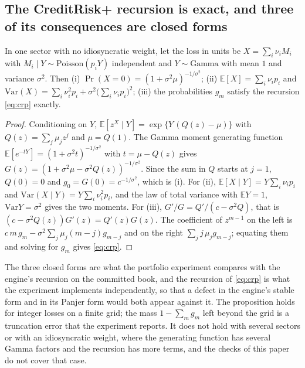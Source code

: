 \subsection{The CreditRisk+ recursion is exact, and three of its consequences are closed forms}

\begin{proposition}\label{prop:crp}
In one sector with no idiosyncratic weight, let the loss in units be $X=\sum_i\nu_iM_i$ with $M_i\mid Y\sim\mathrm{Poisson}(p_iY)$ independent and $Y\sim\mathrm{Gamma}$ with mean $1$ and variance $\sigma^2$. Then (i) $\Pr(X=0)=(1+\sigma^2\mu)^{-1/\sigma^2}$; (ii) $\mathbb{E}[X]=\sum_i\nu_ip_i$ and $\mathrm{Var}(X)=\sum_i\nu_i^2p_i+\sigma^2\bigl(\sum_i\nu_ip_i\bigr)^2$; (iii) the probabilities $g_m$ satisfy the recursion \eqref{eq:crp} exactly.
\end{proposition}

\begin{proof}
Conditioning on $Y$, $\mathbb{E}[z^X\mid Y]=\exp\{Y\,(Q(z)-\mu)\}$ with $Q(z)=\sum_j\mu_jz^j$ and $\mu=Q(1)$. The Gamma moment generating function $\mathbb{E}[e^{-tY}]=(1+\sigma^2t)^{-1/\sigma^2}$ with $t=\mu-Q(z)$ gives $G(z)=(1+\sigma^2\mu-\sigma^2Q(z))^{-1/\sigma^2}$. Since the sum in $Q$ starts at $j=1$, $Q(0)=0$ and $g_0=G(0)=c^{-1/\sigma^2}$, which is (i). For (ii), $\mathbb{E}[X\mid Y]=Y\sum_i\nu_ip_i$ and $\mathrm{Var}(X\mid Y)=Y\sum_i\nu_i^2p_i$, and the law of total variance with $\mathbb{E}Y=1$, $\mathrm{Var}Y=\sigma^2$ gives the two moments. For (iii), $G'/G=Q'/(c-\sigma^2Q)$, that is $(c-\sigma^2Q(z))G'(z)=Q'(z)G(z)$. The coefficient of $z^{m-1}$ on the left is $c\,m\,g_m-\sigma^2\sum_j\mu_j(m-j)g_{m-j}$ and on the right $\sum_jj\,\mu_jg_{m-j}$; equating them and solving for $g_m$ gives \eqref{eq:crp}.
\end{proof}

The three closed forms are what the portfolio experiment compares with the engine's recursion on the committed book, and the recursion of \eqref{eq:crp} is what the experiment implements independently, so that a defect in the engine's stable form and in its Panjer form would both appear against it. The proposition holds for integer losses on a finite grid; the mass $1-\sum_mg_m$ left beyond the grid is a truncation error that the experiment reports. It does not hold with several sectors or with an idiosyncratic weight, where the generating function has several Gamma factors and the recursion has more terms, and the checks of this paper do not cover that case.

